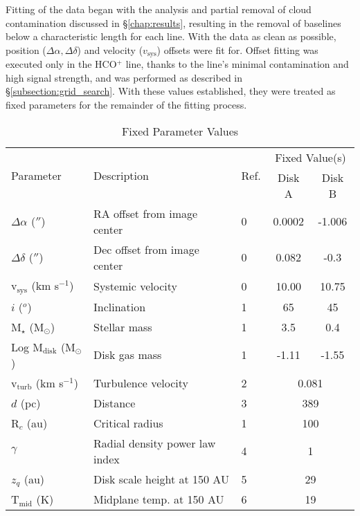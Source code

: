 Fitting of the data began with the analysis and partial removal of cloud contamination discussed in \S\ref{chap:results}, resulting in the removal of baselines below a characteristic length for each line. With the data as clean as possible, position ($\Delta \alpha, \Delta \delta$) and velocity ($v_\text{sys}$) offsets were fit for. Offset fitting was executed only in the HCO$^+$ line, thanks to the line's minimal contamination and high signal strength, and was performed as described in \S\ref{subsection:grid_search}. With these values established, they were treated as fixed parameters for the remainder of the fitting process.

\begin{table}[h!]
  \begin{threeparttable}
    \centering
    \caption{Fixed Parameter Values}
    \label{table:fixed_params}
    \renewcommand{\arraystretch}{1.2}
    \begin{tabular}{l  l  l  c  c }
      \toprule \toprule
      \multirow{2}{*}{Parameter} & \multirow{2}{*}{Description} & \multirow{2}{*}{Ref.} & \multicolumn{2}{c}{Fixed Value(s)} \\
                                 &                              &                         & Disk A & Disk B \\
      \midrule %
      $\Delta \alpha$ ($''$)       &  RA offset from image center     & 0  & 0.0002 & -1.006  \\
      $\Delta \delta$ ($''$)       &  Dec offset from image center    & 0  & 0.082  & -0.3    \\
      v$_\text{sys}$ (km s$^{-1}$) &  Systemic velocity               & 0  & 10.00  & 10.75   \\
      $i$ ($^o$)                   &  Inclination                     & 1  & 65     & 45      \\
      M$_\star$ (M$_\odot$)        &  Stellar mass                    & 1  & 3.5    & 0.4     \\
      Log M$_\text{disk}$ (M$_\odot$) & Disk gas mass\tnote{*}        & 1  & -1.11  & -1.55   \\
      v$_\text{turb}$ (km s$^{-1}$) &  Turbulence velocity            & 2  & \multicolumn{2}{c}{0.081}   \\
      $d$ (pc)                     &  Distance                        & 3  & \multicolumn{2}{c}{389}   \\
      R$_c$ (au)                   &  Critical radius                 & 1  & \multicolumn{2}{c}{100}\\
      $\gamma$                     &  Radial density power law index  & 4  & \multicolumn{2}{c}{1}\\
      $z_q$ (au)                   &  Disk scale height at 150 AU     & 5  & \multicolumn{2}{c}{29}\\
      T$_\text{mid}$ (K)           &  Midplane temp. at 150 AU        & 6  & \multicolumn{2}{c}{19}\\
      \bottomrule
    \end{tabular}


\end{threeparttable}
\end{table}
